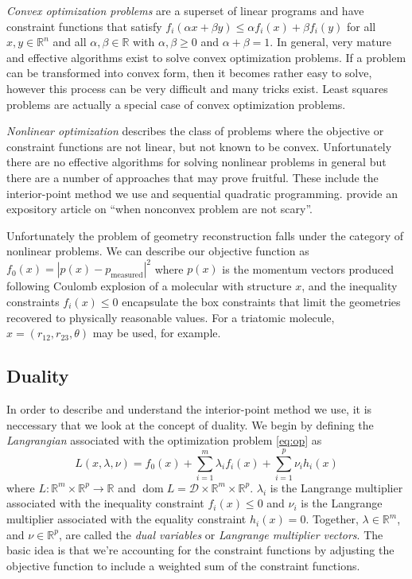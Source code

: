 \emph{Convex optimization problems} are a superset of linear programs and have constraint functions that satisfy $f_i(\alpha x + \beta y) \le \alpha f_i(x) + \beta f_i(y)$ for all $x,y \in \mathbb{R}^n$ and all $\alpha, \beta \in \mathbb{R}$ with $\alpha, \beta \ge 0$ and $\alpha + \beta = 1$. In general, very mature and effective algorithms exist to solve convex optimization problems. If a problem can be transformed into convex form, then it becomes rather easy to solve, however this process can be very difficult and many tricks exist. Least squares problems are actually a special case of convex optimization problems.

\emph{Nonlinear optimization} describes the class of problems where the objective or constraint functions are not linear, but not known to be convex. Unfortunately there are no effective algorithms for solving nonlinear problems in general but there are a number of approaches that may prove fruitful. These include the interior-point method we use and sequential quadratic programming. \citet{Sun15} provide an expository article on ``when nonconvex problem are not scary''.

Unfortunately the problem of geometry reconstruction falls under the category of nonlinear problems. We can describe our objective function as $f_0(x) = |p(x)-p_\textrm{measured}|^2$ where $p(x)$ is the momentum vectors produced following Coulomb explosion of a molecular with structure $x$, and the inequality constraints $f_i(x) \leq 0$ encapsulate the box constraints that limit the geometries recovered to physically reasonable values. For a triatomic molecule, $x = (r_{12}, r_{23}, \theta)$ may be used, for example.


\subsection{Duality}
In order to describe and understand the interior-point method we use, it is neccessary that we look at the concept of duality. We begin by defining the \emph{Langrangian} associated with the optimization problem \eqref{eq:op} as
\begin{equation}
L(x, \lambda, \nu) = f_0(x) + \sum_{i=1}^m \lambda_i f_i(x)
+ \sum_{i=1}^p \nu_i h_i(x)
\end{equation}
where $L: \mathbb{R}^m \times \mathbb{R}^p \rightarrow \mathbb{R}$ and $\operatorname{dom} L = \mathcal{D} \times \mathbb{R}^m \times \mathbb{R}^p$. $\lambda_i$ is the Langrange multiplier associated with the inequality constraint $f_i(x) \leq 0$ and $\nu_i$ is the Langrange multiplier associated with the equality constraint $h_i(x) = 0$. Together, $\lambda \in \mathbb{R}^m$, and $\nu \in \mathbb{R}^p$, are called the \emph{dual variables} or \emph{Langrange multiplier vectors}. The basic idea is that we're accounting for the constraint functions by adjusting the objective function to include a weighted sum of the constraint functions.

